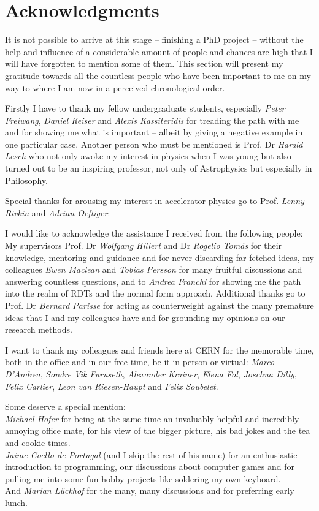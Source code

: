 \section*{Acknowledgments}

It is not possible to arrive at this stage -- finishing a PhD project -- without the help and influence
of a considerable amount of people and chances are high that I will have forgotten to mention some of them.
This section will present my gratitude towards all the countless people who have been important to me
on my way to where I am now in a perceived chronological order.

Firstly I have to thank my fellow undergraduate students, especially \emph{Peter Freiwang},
\emph{Daniel Reiser} and \emph{Alexis Kassiteridis} for treading the path with me
and for showing me what is important
-- albeit by giving a negative example in one particular case.
Another person who must be mentioned is Prof. Dr \emph{Harald Lesch} who not only awoke my interest in physics
when I was young but also turned out to be an inspiring professor, not only of Astrophysics but
especially in Philosophy.

Special thanks for arousing my interest in accelerator physics go to Prof. \emph{Lenny Rivkin} and
\emph{Adrian Oeftiger}.

I would like to acknowledge the assistance I received from the following people:
My supervisors Prof. Dr \emph{Wolfgang Hillert} and Dr \emph{Rogelio Tom\'as} for their
knowledge, mentoring and guidance and for never discarding far fetched ideas,
my colleagues \emph{Ewen Maclean} and \emph{Tobias Persson} for many fruitful discussions
and answering countless questions, and to \emph{Andrea Franchi} for showing me the path into the realm of
RDTs and the normal form approach.
Additional thanks go to Prof. Dr \emph{Bernard Parisse} for acting as counterweight against the
many premature ideas that I and my colleagues have and for grounding my opinions
on our research methods.

I want to thank my colleagues and friends here at CERN for the memorable time,
both in the office and in our free time, be it in person or virtual:
\emph{Marco D'Andrea},
\emph{Sondre Vik Furuseth},
\emph{Alexander Krainer},
\emph{Elena Fol},
\emph{Joschua Dilly},
\emph{Felix Carlier},
\emph{Leon van Riesen-Haupt}
and
\emph{Felix Soubelet}.

Some deserve a special mention:\\
\emph{Michael Hofer} for being at the same time an invaluably helpful and incredibly annoying
office mate, for his view of the bigger picture, his bad jokes and the tea and cookie times.\\
\emph{Jaime Coello de Portugal} (and I skip the rest of his name) for an enthusiastic
introduction to programming,
our discussions about computer games
and for pulling me into some fun hobby projects like soldering my own keyboard.\\
And \emph{Marian Lückhof} for the many, many discussions and for preferring early lunch.

